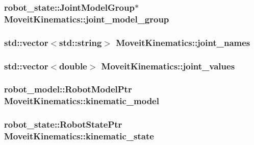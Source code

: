 \hypertarget{classMoveitKinematics_aa988eb59ddeb9f734d9911a5f464f082}{
\subsubsection[{joint\-\_\-model\-\_\-group}]{\setlength{\rightskip}{0pt plus 5cm}robot\-\_\-state\-::\-Joint\-Model\-Group$\ast$ Moveit\-Kinematics\-::joint\-\_\-model\-\_\-group}}\label{classMoveitKinematics_aa988eb59ddeb9f734d9911a5f464f082}
\hypertarget{classMoveitKinematics_ab9ccffd768a0d30944f22db09fbb9f72}{
\subsubsection[{joint\-\_\-names}]{\setlength{\rightskip}{0pt plus 5cm}std\-::vector$<$std\-::string$>$ Moveit\-Kinematics\-::joint\-\_\-names}}\label{classMoveitKinematics_ab9ccffd768a0d30944f22db09fbb9f72}
\hypertarget{classMoveitKinematics_a0ae2d3b65c1855ec6d6f094d1cd267f7}{
\subsubsection[{joint\-\_\-values}]{\setlength{\rightskip}{0pt plus 5cm}std\-::vector$<$double$>$ Moveit\-Kinematics\-::joint\-\_\-values}}\label{classMoveitKinematics_a0ae2d3b65c1855ec6d6f094d1cd267f7}
\hypertarget{classMoveitKinematics_a69d28b2a76e5f5d90cdee38e0a3d5965}{
\subsubsection[{kinematic\-\_\-model}]{\setlength{\rightskip}{0pt plus 5cm}robot\-\_\-model\-::\-Robot\-Model\-Ptr Moveit\-Kinematics\-::kinematic\-\_\-model}}\label{classMoveitKinematics_a69d28b2a76e5f5d90cdee38e0a3d5965}
\hypertarget{classMoveitKinematics_ad59ff2cb08c79d9337b6852da2d4aadf}{
\subsubsection[{kinematic\-\_\-state}]{\setlength{\rightskip}{0pt plus 5cm}robot\-\_\-state\-::\-Robot\-State\-Ptr Moveit\-Kinematics\-::kinematic\-\_\-state}}\label{classMoveitKinematics_ad59ff2cb08c79d9337b6852da2d4aadf}
